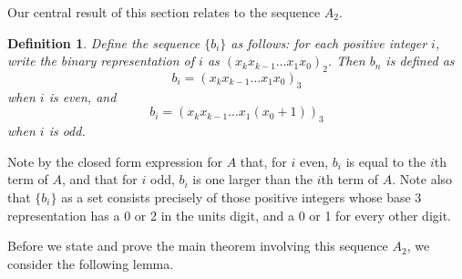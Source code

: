 \documentclass[11pt,letterpaper,twoside,english]{article}
\theoremstyle{theorem}
\newtheorem{definition}[theorem]{Definition}
\theoremstyle{remark}
\begin{document}
Our central result of this section relates to the sequence $A_2$.
\begin{definition} \label{def:b_n}
Define the sequence $\{b_i\}$ as follows: for each positive integer $i$, write the binary representation of $i$ as $(x_kx_{k-1}\ldots x_1x_0)_2$. Then $b_n$ is defined as
\[b_i=(x_k x_{k-1}\ldots x_1x_0)_3\]
when $i$ is even, and
\[b_i=(x_k x_{k-1}\ldots x_{1}(x_0+1))_3\]
when $i$ is odd.
\end{definition}
Note by the closed form expression for $A$ that, for $i$ even, $b_i$ is equal to the $i$th term of $A$, and that for $i$ odd, $b_i$ is one larger than the $i$th term of $A$. Note also that $\{b_i\}$ as a set consists precisely of those positive integers whose base 3 representation has a 0 or 2 in the units digit, and a 0 or 1 for every other digit.

Before we state and prove the main theorem involving this sequence $A_2$, we consider the following lemma.
\end{document}
